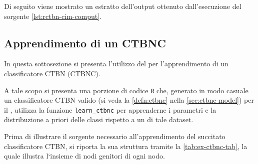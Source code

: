 \vspace*{8pt}

Di seguito viene mostrato un estratto dell'output ottenuto dall'esecuzione del sorgente \ref{lst:rctbn-cim-comput}.

\vspace*{8pt}\vspace*{8pt}

\subsection{Apprendimento di un CTBNC}
In questa sottosezione si presenta l'utilizzo del \pacchettor{} per l'apprendimento di un classificatore \acs{CTBN} (\acs{CTBNC}).

A tale scopo si presenta una porzione di codice \lstinline$R$ che, generato in modo casuale un classificatore \acs{CTBN} valido (si veda la \autoref{defn:ctbnc} nella \vref{sec:ctbnc-model}) per il , utilizza la funzione \lstinline[language=rstats]{learn_ctbnc} per apprenderne i parametri e la distribuzione a priori delle classi rispetto a un \emph{} di tale dataset.

Prima di illustrare il sorgente necessario all'apprendimento del succitato classificatore \acs{CTBN}, si riporta la sua struttura tramite la \vref{tab:ex-ctbnc-tab}, la quale illustra l`insieme di nodi genitori di ogni nodo.

